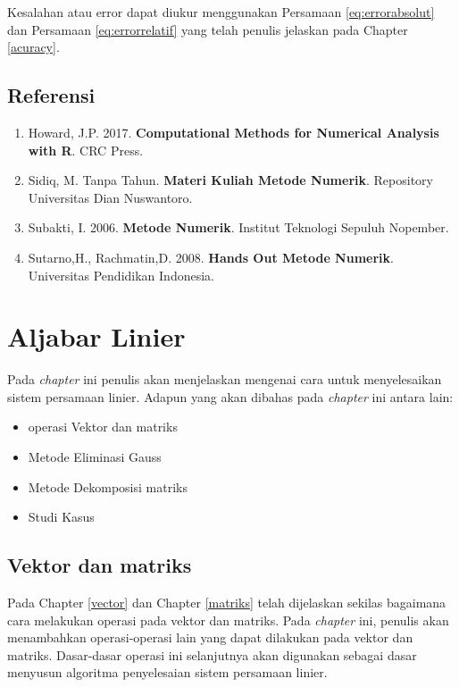 \documentclass[]{book}
\providecommand{\tightlist}{%
  \setlength{\itemsep}{0pt}\setlength{\parskip}{0pt}}
\theoremstyle{definition}
\theoremstyle{definition}
\theoremstyle{definition}
\theoremstyle{remark}
\begin{document}
Kesalahan atau error dapat diukur menggunakan Persamaan \eqref{eq:errorabsolut} dan Persamaan \eqref{eq:errorrelatif} yang telah penulis jelaskan pada Chapter \ref{acuracy}.

\hypertarget{referensi-4}{%
\section{Referensi}\label{referensi-4}}

\begin{enumerate}
\def\labelenumi{\arabic{enumi}.}
\tightlist
\item
  Howard, J.P. 2017. \textbf{Computational Methods for Numerical Analysis with R}. CRC Press.
\item
  Sidiq, M. Tanpa Tahun. \textbf{Materi Kuliah Metode Numerik}. Repository Universitas Dian Nuswantoro.
\item
  Subakti, I. 2006. \textbf{Metode Numerik}. Institut Teknologi Sepuluh Nopember.
\item
  Sutarno,H., Rachmatin,D. 2008. \textbf{Hands Out Metode Numerik}. Universitas Pendidikan Indonesia.
\end{enumerate}

\hypertarget{linearaljabar}{%
\chapter{Aljabar Linier}\label{linearaljabar}}

Pada \emph{chapter} ini penulis akan menjelaskan mengenai cara untuk menyelesaikan sistem persamaan linier. Adapun yang akan dibahas pada \emph{chapter} ini antara lain:

\begin{itemize}
\tightlist
\item
  operasi Vektor dan matriks
\item
  Metode Eliminasi Gauss
\item
  Metode Dekomposisi matriks
\item
  Studi Kasus
\end{itemize}

\hypertarget{vecmat}{%
\section{Vektor dan matriks}\label{vecmat}}

Pada Chapter \ref{vector} dan Chapter \ref{matriks} telah dijelaskan sekilas bagaimana cara melakukan operasi pada vektor dan matriks. Pada \emph{chapter} ini, penulis akan menambahkan operasi-operasi lain yang dapat dilakukan pada vektor dan matriks. Dasar-dasar operasi ini selanjutnya akan digunakan sebagai dasar menyusun algoritma penyelesaian sistem persamaan linier.
\end{document}
